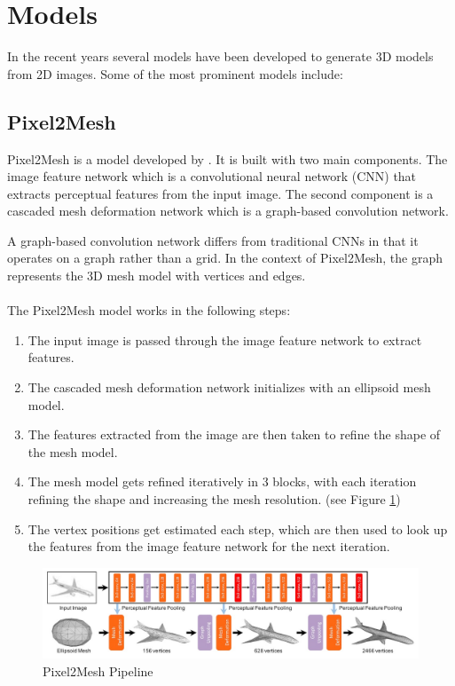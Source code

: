 \section{Models}

In the recent years several models have been developed to generate 3D models from 2D images. Some of the most prominent models include:

\subsection{Pixel2Mesh}
Pixel2Mesh is a model developed by \textcite{wang_pixel2mesh_2018}.
It is built with two main components. The image feature network which is a convolutional neural network (CNN) that extracts perceptual features from the input image. The second component is a cascaded mesh deformation network which is a graph-based convolution network.

A graph-based convolution network differs from traditional CNNs in that it operates on a graph rather than a grid. In the context of Pixel2Mesh, the graph represents the 3D mesh model with vertices and edges.

\paragraph{}
The Pixel2Mesh model works in the following steps:
\begin{enumerate}
    \item The input image is passed through the image feature network to extract features.
    \item The cascaded mesh deformation network initializes with an ellipsoid mesh model.
    \item The features extracted from the image are then taken to refine the shape of the mesh model.
    \item The mesh model gets refined iteratively in 3 blocks, with each iteration refining the shape and increasing the mesh resolution. (see Figure \ref{fig:pixel2mesh})
    \item The vertex positions get estimated each step, which are then used to look up the features from the image feature network for the next iteration.
\end{enumerate}
\begin{figure}
    \centering
    \includegraphics[width=1\linewidth]{images/pixel2mesh.jpg}
    \caption{Pixel2Mesh Pipeline \autocite{horn_shape_1989}}
    \label{fig:pixel2mesh}
\end{figure}

